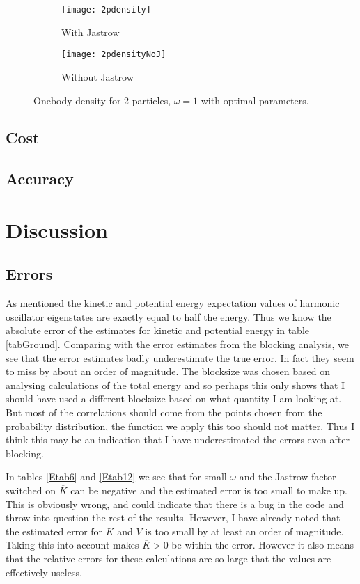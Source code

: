 \documentclass[a4paper,English,10pt]{article}
\renewcommand{\bar}{\overline}
\begin{document}
\begin{figure}
  \centering
  \begin{subfigure}{0.5\textwidth}
    \centering
    \texttt{[image: 2pdensity]}
    \caption{With Jastrow}
    \label{fig:inclu}
  \end{subfigure}%
  \begin{subfigure}{0.5\textwidth}
    \centering
    \texttt{[image: 2pdensityNoJ]}
    \caption{Without Jastrow}
    \label{fig:deform}
  \end{subfigure}
  \caption{Onebody density for 2 particles, $\omega = 1$ with optimal parameters.}
  \label{fig:onebody}
\end{figure}
\subsection{Cost}

\subsection{Accuracy}


\section{Discussion}
\subsection{Errors}
As mentioned the kinetic and potential energy expectation values of harmonic oscillator eigenstates are exactly equal to half the energy.
Thus we know the absolute error of the estimates for kinetic and potential energy in table \ref{tabGround}. Comparing with the error estimates from the blocking analysis,
we see that the error estimates badly underestimate the true error. In fact they seem to miss by about an order of magnitude. The blocksize was chosen based on analysing calculations
of the total energy and so perhaps this only shows that I should have used a different blocksize based on what quantity I am looking at. But most of the correlations
should come from the points chosen from the probability distribution, the function we apply this too should not matter. Thus I think this may be an indication that I have
underestimated the errors even after blocking.

In tables \ref{Etab6} and \ref{Etab12} we see that for small $\omega$ and the Jastrow factor switched on $\bar{K}$ can be negative and the estimated error is too small to make up.
This is obviously wrong, and could indicate that there is a bug in the code and throw into question the rest of the results. However, I have already noted that the estimated error
for $K$ and $V$ is too small by at least an order of magnitude. Taking this into account makes $\bar{K} > 0$ be within the error. However it also means that the relative errors
for these calculations are so large that the values are effectively useless.
\end{document}
